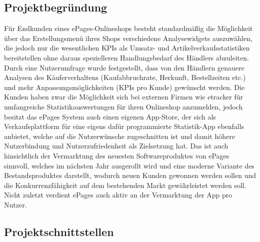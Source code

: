 \subsection{Projektbegründung} 
\label{sec:Projektbegruendung}

Für Endkunden eines ePages-Onlineshops besteht standardmäßig die Möglichkeit über das Erstellungsmenü ihres Shops verschiedene Analysewidgets auszuwählen, die jedoch nur die wesentlichen KPIs als Umsatz- und Artikelverkaufsstatistiken bereitstellen ohne daraus spezielleren Handlungsbedarf des Händlers abzuleiten. Durch eine Nutzerumfrage wurde festgestellt, dass von den Händlern genauere Analysen des Käuferverhaltens (Kaufabbruchrate, Herkunft, Bestellzeiten etc.) und mehr Anpassungsmöglichkeiten (KPIs pro Kunde) gewünscht werden. Die Kunden haben zwar die Möglichkeit sich bei externen Firmen wie etracker für umfangreiche Statistikauswertungen für ihren Onlineshop anzumelden, jedoch besitzt das ePages System auch einen eigenen App-Store, der sich als Verkaufsplattform für eine eigens dafür programmierte Statistik-App ebenfalls anbietet, welche auf die Nutzerwünsche zugeschnitten ist und damit höhere Nutzerbindung und Nutzerzufriedenheit als Zielsetzung hat. Das ist auch hinsichtlich der Vermarktung des neuesten Softwareproduktes von ePages sinnvoll, welches im nächsten Jahr ausgerollt wird und eine moderne Variante des Bestandsproduktes darstellt, wodurch neuen Kunden gewonnen werden sollen und die Konkurrenzfähigkeit auf dem bestehenden Markt gewährleistet werden soll. Nicht zuletzt verdient ePages auch aktiv an der Vermarktung der App pro Nutzer.


\subsection{Projektschnittstellen} 
\label{sec:Projektschnittstellen}

